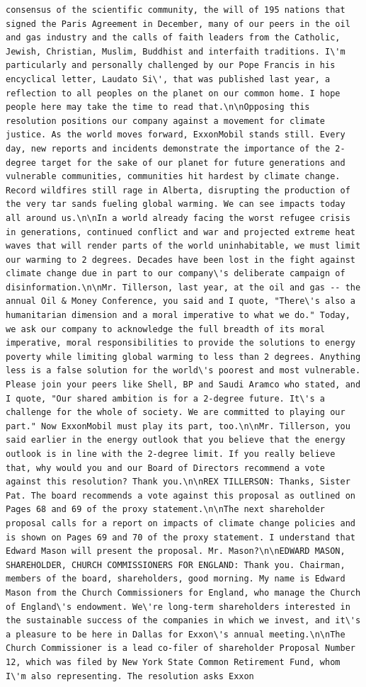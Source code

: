 \documentclass[
  letterpaper,
  DIV=11,
  numbers=noendperiod]{scrreprt}
\begin{document}
\begin{verbatim}
consensus of the scientific community, the will of 195 nations that signed the Paris Agreement in December, many of our peers in the oil and gas industry and the calls of faith leaders from the Catholic, Jewish, Christian, Muslim, Buddhist and interfaith traditions. I\'m particularly and personally challenged by our Pope Francis in his encyclical letter, Laudato Si\', that was published last year, a reflection to all peoples on the planet on our common home. I hope people here may take the time to read that.\n\nOpposing this resolution positions our company against a movement for climate justice. As the world moves forward, ExxonMobil stands still. Every day, new reports and incidents demonstrate the importance of the 2-degree target for the sake of our planet for future generations and vulnerable communities, communities hit hardest by climate change. Record wildfires still rage in Alberta, disrupting the production of the very tar sands fueling global warming. We can see impacts today all around us.\n\nIn a world already facing the worst refugee crisis in generations, continued conflict and war and projected extreme heat waves that will render parts of the world uninhabitable, we must limit our warming to 2 degrees. Decades have been lost in the fight against climate change due in part to our company\'s deliberate campaign of disinformation.\n\nMr. Tillerson, last year, at the oil and gas -- the annual Oil & Money Conference, you said and I quote, "There\'s also a humanitarian dimension and a moral imperative to what we do." Today, we ask our company to acknowledge the full breadth of its moral imperative, moral responsibilities to provide the solutions to energy poverty while limiting global warming to less than 2 degrees. Anything less is a false solution for the world\'s poorest and most vulnerable. Please join your peers like Shell, BP and Saudi Aramco who stated, and I quote, "Our shared ambition is for a 2-degree future. It\'s a challenge for the whole of society. We are committed to playing our part." Now ExxonMobil must play its part, too.\n\nMr. Tillerson, you said earlier in the energy outlook that you believe that the energy outlook is in line with the 2-degree limit. If you really believe that, why would you and our Board of Directors recommend a vote against this resolution? Thank you.\n\nREX TILLERSON: Thanks, Sister Pat. The board recommends a vote against this proposal as outlined on Pages 68 and 69 of the proxy statement.\n\nThe next shareholder proposal calls for a report on impacts of climate change policies and is shown on Pages 69 and 70 of the proxy statement. I understand that Edward Mason will present the proposal. Mr. Mason?\n\nEDWARD MASON, SHAREHOLDER, CHURCH COMMISSIONERS FOR ENGLAND: Thank you. Chairman, members of the board, shareholders, good morning. My name is Edward Mason from the Church Commissioners for England, who manage the Church of England\'s endowment. We\'re long-term shareholders interested in the sustainable success of the companies in which we invest, and it\'s a pleasure to be here in Dallas for Exxon\'s annual meeting.\n\nThe Church Commissioner is a lead co-filer of shareholder Proposal Number 12, which was filed by New York State Common Retirement Fund, whom I\'m also representing. The resolution asks Exxon 
\end{verbatim}
\end{document}
